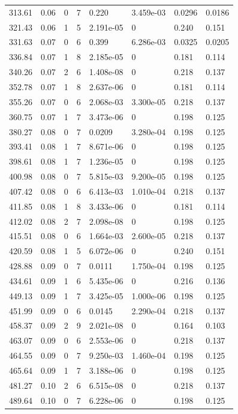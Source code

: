 \documentclass[preview]{standalone}
\begin{document}
{{{\begin{tabular}{L{1.2cm}C{1.2cm} C{0.3cm}C{0.5cm} C{1.4cm}C{1.4cm} C{1.4cm}C{1.4cm}}
  313.61  &  0.06  & 0     &  7 &  0.220  & 3.459e-03  & 0.0296 &  0.0186   \\ 
  321.43  &  0.06  & 1     &  5 &  2.191e-05  & 0  & 0.240 &  0.151   \\ 
  331.63  &  0.07  & 0     &  6 &  0.399  & 6.286e-03  & 0.0325 &  0.0205   \\ 
  336.84  &  0.07  & 1     &  8 &  2.185e-05  & 0  & 0.181 &  0.114   \\ 
  340.26  &  0.07  & 2     &  6 &  1.408e-08  & 0  & 0.218 &  0.137   \\ 
  352.78  &  0.07  & 1     &  8 &  2.637e-06  & 0  & 0.181 &  0.114   \\ 
  355.26  &  0.07  & 0     &  6 &  2.068e-03  & 3.300e-05  & 0.218 &  0.137   \\ 
  360.75  &  0.07  & 1     &  7 &  3.473e-06  & 0  & 0.198 &  0.125   \\ 
  380.27  &  0.08  & 0     &  7 &  0.0209  & 3.280e-04  & 0.198 &  0.125   \\ 
  393.41  &  0.08  & 1     &  7 &  8.671e-06  & 0  & 0.198 &  0.125   \\ 
  398.61  &  0.08  & 1     &  7 &  1.236e-05  & 0  & 0.198 &  0.125   \\ 
  400.98  &  0.08  & 0     &  7 &  5.815e-03  & 9.200e-05  & 0.198 &  0.125   \\ 
  407.42  &  0.08  & 0     &  6 &  6.413e-03  & 1.010e-04  & 0.218 &  0.137   \\ 
  411.85  &  0.08  & 1     &  8 &  3.433e-06  & 0  & 0.181 &  0.114   \\ 
  412.02  &  0.08  & 2     &  7 &  2.098e-08  & 0  & 0.198 &  0.125   \\ 
  415.51  &  0.08  & 0     &  6 &  1.664e-03  & 2.600e-05  & 0.218 &  0.137   \\ 
  420.59  &  0.08  & 1     &  5 &  6.072e-06  & 0  & 0.240 &  0.151   \\ 
  428.88  &  0.09  & 0     &  7 &  0.0111  & 1.750e-04  & 0.198 &  0.125   \\ 
  434.61  &  0.09  & 1     &  6 &  5.435e-06  & 0  & 0.216 &  0.136   \\ 
  449.13  &  0.09  & 1     &  7 &  3.425e-05  & 1.000e-06  & 0.198 &  0.125   \\ 
  451.99  &  0.09  & 0     &  6 &  0.0145  & 2.290e-04  & 0.218 &  0.137   \\ 
  458.37  &  0.09  & 2     &  9 &  2.021e-08  & 0  & 0.164 &  0.103   \\ 
  463.07  &  0.09  & 0     &  6 &  2.553e-06  & 0  & 0.218 &  0.137   \\ 
  464.55  &  0.09  & 0     &  7 &  9.250e-03  & 1.460e-04  & 0.198 &  0.125   \\ 
  465.64  &  0.09  & 1     &  7 &  3.188e-06  & 0  & 0.198 &  0.125   \\ 
  481.27  &  0.10  & 2     &  6 &  6.515e-08  & 0  & 0.218 &  0.137   \\ 
  489.64  &  0.10  & 0     &  7 &  6.228e-06  & 0  & 0.198 &  0.125   \\ 
\hline 
\end{tabular} 

}}}
\end{document}
